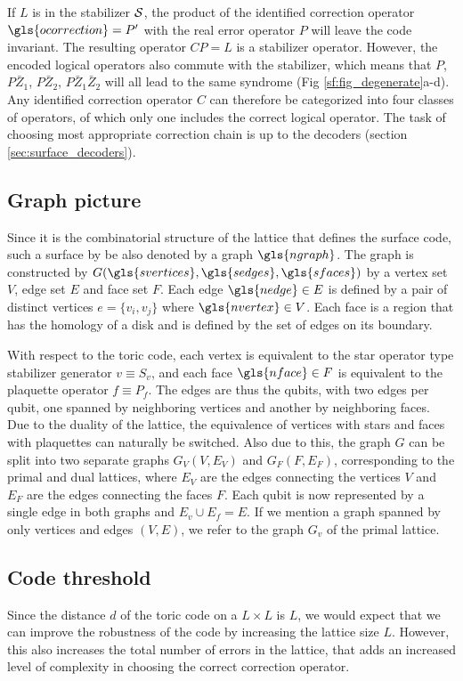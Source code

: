 If $L$ is in the stabilizer $\mathcal{S}$, the product of the identified correction operator $\gls{ocorrection}=P'$ with the real error operator $P$ will leave the code invariant. The resulting operator $CP=L$ is a stabilizer operator. However, the encoded logical operators also commute with the stabilizer, which means that $P$, $P\bar{Z}_1$, $P\bar{Z}_2$, $P\bar{Z}_1\bar{Z}_2$ will all lead to the same syndrome (Fig \ref{sf:fig_degenerate}a-d). Any identified correction operator $C$ can therefore be categorized into four classes of operators, of which only one includes the correct logical operator. The task of choosing most appropriate correction chain is up to the decoders (section \ref{sec:surface_decoders}).

\subsection{Graph picture}\label{sec:toricgraph}
Since it is the combinatorial structure of the lattice that defines the surface code, such a surface by be also denoted by a graph $\gls{ngraph}$. The graph is constructed by $G(\gls{svertices}, \gls{sedges}, \gls{sfaces})$ by a vertex set $V$, edge set $E$ and face set $F$. Each edge $\gls{nedge}\in E$ is defined by a pair of distinct vertices $e=\{v_i, v_j\}$ where $\gls{nvertex}\in V$. Each face is a region that has the homology of a disk and is defined by the set of edges on its boundary. 

With respect to the toric code, each vertex is equivalent to the star operator type stabilizer generator $v\equiv S_v$, and each face $\gls{nface}\in F$ is equivalent to the plaquette operator $f\equiv P_f$. The edges are thus the qubits, with two edges per qubit, one spanned by neighboring vertices and another by neighboring faces. Due to the duality of the lattice, the equivalence of vertices with stars and faces with plaquettes can naturally be switched. Also due to this, the graph $G$ can be split into two separate graphs $G_V(V, E_V)$ and $G_F(F, E_F)$, corresponding to the primal and dual lattices, where $E_V$ are the edges connecting the vertices $V$ and $E_F$ are the edges connecting the faces $F$. Each qubit is now represented by a single edge in both graphs and $E_v\cup E_f=E$. If we mention a graph spanned by only vertices and edges $(V,E)$, we refer to the graph $G_v$ of the primal lattice. 


\subsection{Code threshold}\label{sec:threshold}
Since the distance $d$ of the toric code on a $L\times L$ is $L$, we would expect that we can improve the robustness of the code by increasing the lattice size $L$. However, this also increases the total number of errors in the lattice, that adds an increased level of complexity in choosing the correct correction operator.


